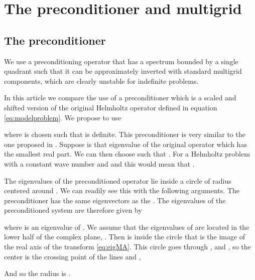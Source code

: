 \documentclass[mathpazo]{cicp}
\theoremstyle{definition}
\numberwithin{equation}{section}
\providecommand{\wv}{}
\begin{document}
\section{The  preconditioner and multigrid} \label{sec:precmg}
\subsection{The preconditioner} \label{subsec:precon}
We use a preconditioning operator that has a spectrum bounded by a single quadrant such that it 
can be approximately inverted with standard multigrid components, which are clearly unstable for indefinite problems.

In this article we compare the use of a preconditioner  which is a scaled 
and shifted version of the original Helmholtz operator  defined in equation \eqref{eq:modelproblem}.
We propose to use

where  is chosen such that  is definite. This preconditioner is very similar to the
one proposed in \cite{meerbergen2009}.
 Suppose  is that eigenvalue of the original operator  which has the smallest real part.
We can then choose  such that .  For a Helmholtz problem with a constant wave number 
\wv{and  and } this would mean that .






The eigenvalues of the preconditioned operator \wv{} lie inside a circle of radius
 centered around
.  We
can readily see this with the following arguments. The preconditioner
 has the same
eigenvectors as the . The eigenvalues of the
preconditioned system \wv{} are therefore given by

where  is an eigenvalue of \wv{}. We assume that
the eigenvalues of  are located in the lower half of the complex
plane, . Then  is
inside the circle that is the image of the real axis of the transform
\eqref{eq:eigMA}. This circle goes through ,
 and , so the
center  is the crossing point of the lines 
and ,

And so the radius is .
\end{document}
